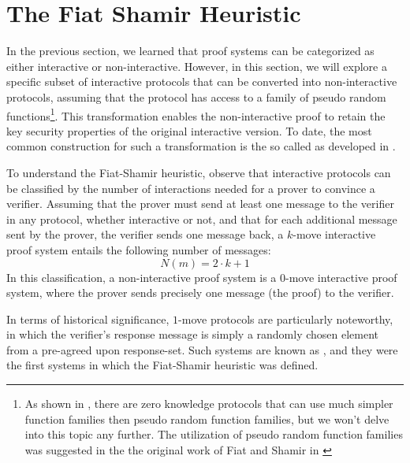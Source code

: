 \section{The Fiat Shamir Heuristic}\label{sec:Fiat-Shamir}
In the previous section, we learned that proof systems can be categorized as either interactive or non-interactive. However, in this section, we will explore a specific subset of interactive protocols that can be converted into non-interactive protocols, assuming that the protocol has access to a family of pseudo random functions\footnote{As shown in \cite{chen-20}, there are zero knowledge protocols that can use much simpler function families then pseudo random function families, but we won't delve into this topic any further. The utilization of pseudo random function families was suggested in the the original work of Fiat and Shamir in \cite{fiat-86}}. This transformation enables the non-interactive proof to retain the key security properties of the original interactive version. To date, the most common construction for such a transformation is the so called  as developed in \cite{fiat-86}. 

To understand the Fiat-Shamir heuristic, observe that interactive protocols can be classified by the number of interactions needed for a prover to convince a verifier. Assuming that the prover must send at least one message to the verifier in any protocol, whether interactive or not, and that for each additional message sent by the prover, the verifier sends one message back, a $k$-move interactive proof system entails the following number of messages:
\begin{equation}
\label{def:k-move-interactive-protocol}
N(m) = 2\cdot k +1
\end{equation}
In this classification, a non-interactive proof system is a $0$-move interactive proof system, where the prover sends precisely one message (the proof) to the verifier. 

In terms of historical significance, $1$-move protocols are particularly noteworthy, in which the verifier's response message is simply a randomly chosen element from a pre-agreed upon response-set. Such systems are known as , and they were the first systems in which the Fiat-Shamir heuristic was defined.

